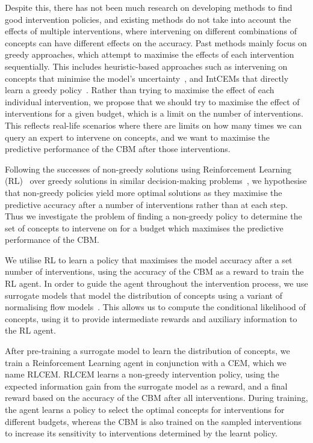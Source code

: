 Despite this, there has not been much research on developing
methods to find good intervention policies, and 
existing methods do not
take into account the effects of multiple
interventions, where intervening on different combinations
of concepts can have different effects on the accuracy.
Past methods mainly focus on greedy approaches, which
attempt to maximise the effects of each intervention
sequentially.
This includes heuristic-based approaches such as intervening on concepts that minimise the
model's uncertainty~\cite{ectp, coop}, and IntCEMs
that directly learn a greedy policy~\cite{intcem}.
Rather than trying to maximise the effect of each individual 
intervention, we propose that we should 
try to maximise the effect of interventions for a given 
budget, 
which is a limit on the number of interventions.
This
reflects real-life scenarios where
there are limits on how many times we 
can query an expert to intervene on concepts, and 
we want to maximise the predictive 
performance of the CBM after those interventions.


Following the successes of non-greedy solutions 
using 
Reinforcement Learning (RL)~\cite{rl} over
greedy solutions in similar 
decision-making problems~\cite{gsmrl, non-greedy-2, non-greedy-1},
we hypothesise that non-greedy policies
yield more optimal solutions as they maximise 
the predictive accuracy after a number of interventions rather than at each step.
Thus we investigate the problem of
finding a non-greedy policy to determine
the set of concepts to intervene on for a budget which
maximises the predictive performance of the CBM.

We utilise RL
to learn a policy that maximises
the model accuracy after a set number of interventions,
using the accuracy of the CBM as a reward to train the RL agent.
In order
to guide the agent throughout the intervention process,
we use surrogate models that model the distribution of concepts using
a variant of normalising flow models~\cite{normalizing-flows}. 
This allows us to compute the conditional likelihood of concepts, using it to provide intermediate rewards and auxiliary information to the RL agent.

After pre-training a surrogate model to learn the distribution of concepts,
we train a Reinforcement Learning agent in conjunction with a CEM, which we name RLCEM.
RLCEM learns a 
non-greedy intervention policy, using
the expected information gain from the surrogate model
as a reward, and a final reward based on the 
accuracy of the CBM after all interventions.
During training,
the agent learns a policy to select
the optimal concepts for interventions for different budgets,
whereas the CBM is also trained on the sampled interventions
to increase its sensitivity to interventions determined by 
the learnt policy.

